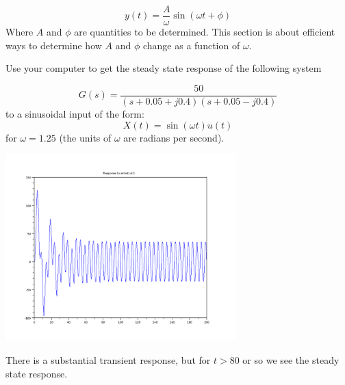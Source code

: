 \[
y(t) = \frac{A}{\omega}  \sin(\omega t + \phi)
\]
Where $A$ and $\phi$ are quantities to be determined.   This section is about efficient ways to determine how $A$ and $\phi$ change as a function of $\omega$.


\begin{ExampleSmall}
Use your computer  to get the steady state response of  the following system

\[
G(s) = \frac{50}{(s+0.05+j0.4)(s+0.05-j0.4)}
\]
to a sinusoidal input of the form:
\[
X(t) = \sin(\omega t)u(t)
\]
for $\omega = 1.25$ (the units of $\omega$ are radians per second).


\includegraphics[width=3.5in]{figs05/sinusoid_contina.png}

There is a substantial transient response, but for $t>80$ or so we see the steady state response.

\end{ExampleSmall}





